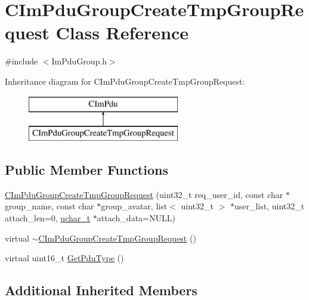 \hypertarget{class_c_im_pdu_group_create_tmp_group_request}{}\section{C\+Im\+Pdu\+Group\+Create\+Tmp\+Group\+Request Class Reference}
\label{class_c_im_pdu_group_create_tmp_group_request}


{\ttfamily \#include $<$Im\+Pdu\+Group.\+h$>$}

Inheritance diagram for C\+Im\+Pdu\+Group\+Create\+Tmp\+Group\+Request\+:\begin{figure}[H]
\begin{center}
\leavevmode
\includegraphics[height=2.000000cm]{class_c_im_pdu_group_create_tmp_group_request}
\end{center}
\end{figure}
\subsection*{Public Member Functions}
\begin{DoxyCompactItemize}
\item 
\hyperlink{class_c_im_pdu_group_create_tmp_group_request_ab0dbe7ac3a9f0e601dbbc991c01763fb}{C\+Im\+Pdu\+Group\+Create\+Tmp\+Group\+Request} (uint32\+\_\+t req\+\_\+user\+\_\+id, const char $\ast$group\+\_\+name, const char $\ast$group\+\_\+avatar, list$<$ uint32\+\_\+t $>$ $\ast$user\+\_\+list, uint32\+\_\+t attach\+\_\+len=0, \hyperlink{base_2ostype_8h_a124ea0f8f4a23a0a286b5582137f0b8d}{uchar\+\_\+t} $\ast$attach\+\_\+data=N\+U\+L\+L)
\item 
virtual \hyperlink{class_c_im_pdu_group_create_tmp_group_request_a6a4c5c418a93408ff5cc2cc103a4c1e9}{$\sim$\+C\+Im\+Pdu\+Group\+Create\+Tmp\+Group\+Request} ()
\item 
virtual uint16\+\_\+t \hyperlink{class_c_im_pdu_group_create_tmp_group_request_ad31291c6c0d2a67b4509068ed3d9b4f8}{Get\+Pdu\+Type} ()
\end{DoxyCompactItemize}
\subsection*{Additional Inherited Members}


